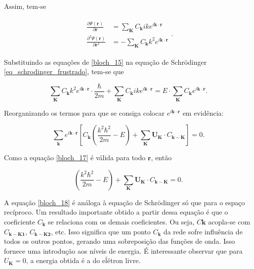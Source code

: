 	\par Assim, tem-se

	\begin{align}\label{bloch_15}
	      \begin{array}{ll}
	        \displaystyle \frac{\partial \Psi(\mathbf{r})}{\partial\mathbf{r}} &= \sum_{\mathbf{K}} C_{\mathbf{k}} ik e^{i\mathbf{k}\cdot \mathbf{r}}\\
	        \displaystyle \frac{\partial^2 \Psi(\mathbf{r})}{\partial\mathbf{r}^2} &= -\sum_{\mathbf{K}} C_{\mathbf{k}} k^2 e^{i\mathbf{k}\cdot \mathbf{r}}	            
	      \end{array}
	      .
  \end{align}

	Substituindo as equações de \eqref{bloch_15} na equação de Schrödinger \eqref{eq_schrodinger_frustrado}, tem-se que

	\begin{equation}
		\label{bloch_16}
		\sum_{\mathbf{K}} C_{\mathbf{k}} k^2 e^{i\mathbf{k}\cdot \mathbf{r}} \cdot \frac{\hbar}{2m}
			+ \sum_{\mathbf{K}} C_{\mathbf{k}} ik e^{i\mathbf{k}\cdot \mathbf{r}}
			= E \cdot \sum_{\mathbf{K}} C_{\mathbf{k}} e^{i\mathbf{k}\cdot \mathbf{r}}.
	\end{equation}

	Reorganizando os termos para que se consiga colocar $e^{i\mathbf{k}\cdot \mathbf{r}}$ em evidência:

	\begin{equation}
		\label{bloch_17}
		\sum_{\mathbf{k}} e^{i\mathbf{k}\cdot \mathbf{r}}
			\left[ 
				C_\mathbf{k} \left( \frac{k^2 \hbar^2}{2m} - E \right)
				+ \sum_{\mathbf{K}} \mathbf{U}_{\mathbf{K}} \cdot C_{\mathbf{k-K}}
		   \right] = 0.
	\end{equation}

	Como a equação \eqref{bloch_17} é válida para todo $\mathbf{r}$, então

	\begin{equation}
		\label{bloch_18}
		\left( \frac{k^2 \hbar^2}{2m} - E \right)
				+ \sum_{\mathbf{K}} \mathbf{U}_{\mathbf{K}} \cdot C_{\mathbf{k-K}} = 0.
	\end{equation}

	\par A equação \eqref{bloch_18} é análoga à equação de Schrödinger só que para o espaço recíproco\cite{qm_fis2}. Um resultado importante obtido a partir dessa equação é que o coeficiente $C_{\mathbf{k}}$ se relaciona com os demais coeficientes\cite{qm_fis5}. Ou seja, $C\mathbf{k}$ acopla-se com $C_{\mathbf{k-K1}}$, $C_{\mathbf{k-K2}}$, etc. Isso significa que um ponto $C_{\mathbf{k}}$ da rede sofre influência de todos os outros pontos, gerando uma sobreposição das funções de onda. Isso fornece uma introdução aos níveis de energia\cite{bloch2}. É interessante observar que para $U_{\mathbf{K}} = 0$, a energia obtida é a do eĺétron livre.

